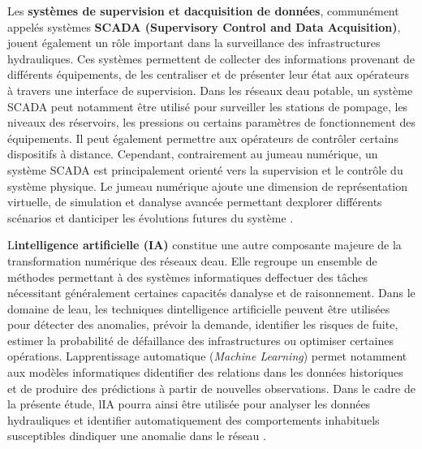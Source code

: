 \documentclass[12pt,a4paper,oneside]{report}
\begin{document}
Les \textbf{systèmes de supervision et d\textquotesingle acquisition de
données}, communément appelés systèmes \textbf{SCADA (Supervisory
Control and Data Acquisition)}, jouent également un rôle important dans
la surveillance des infrastructures hydrauliques. Ces systèmes
permettent de collecter des informations provenant de différents
équipements, de les centraliser et de présenter leur état aux opérateurs
à travers une interface de supervision. Dans les réseaux
d\textquotesingle eau potable, un système SCADA peut notamment être
utilisé pour surveiller les stations de pompage, les niveaux des
réservoirs, les pressions ou certains paramètres de fonctionnement des
équipements. Il peut également permettre aux opérateurs de contrôler
certains dispositifs à distance. Cependant, contrairement au jumeau
numérique, un système SCADA est principalement orienté vers la
supervision et le contrôle du système physique. Le jumeau numérique
ajoute une dimension de représentation virtuelle, de simulation et
d\textquotesingle analyse avancée permettant d\textquotesingle explorer
différents scénarios et d\textquotesingle anticiper les évolutions
futures du système \cite{ref54}.

L\textquotesingle{}\textbf{intelligence artificielle (IA)} constitue une
autre composante majeure de la transformation numérique des réseaux
d\textquotesingle eau. Elle regroupe un ensemble de méthodes permettant
à des systèmes informatiques d\textquotesingle effectuer des tâches
nécessitant généralement certaines capacités d\textquotesingle analyse
et de raisonnement. Dans le domaine de l\textquotesingle eau, les
techniques d\textquotesingle intelligence artificielle peuvent être
utilisées pour détecter des anomalies, prévoir la demande, identifier
les risques de fuite, estimer la probabilité de défaillance des
infrastructures ou optimiser certaines opérations.
L\textquotesingle apprentissage automatique (\emph{Machine Learning})
permet notamment aux modèles informatiques d\textquotesingle identifier
des relations dans les données historiques et de produire des
prédictions à partir de nouvelles observations. Dans le cadre de la
présente étude, l\textquotesingle IA pourra ainsi être utilisée pour
analyser les données hydrauliques et identifier automatiquement des
comportements inhabituels susceptibles d\textquotesingle indiquer une
anomalie dans le réseau \cite{ref55}.
\end{document}

